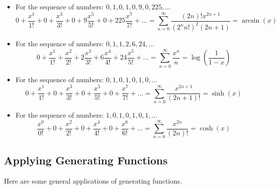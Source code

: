 \documentclass[letterpaper]{article}
\begin{document}
\begin{itemize}
    \item For the sequence of numbers: $0, 1, 0, 1, 0, 9, 0, 225, \dots$
    \[0 + \frac{x^1}{1!} + 0 + \frac{x^3}{3!} + 0 + 9 \frac{x^5}{5!} + 0 + 225 \frac{x^7}{7!} + \dots = \sum_{n = 0}^{\infty} \frac{(2n)! x^{2n + 1}}{(2^n n!)^2 (2n + 1)} = \arcsin(x)\]

    \item For the sequence of numbers: $0, 1, 1, 2, 6, 24, \dots$
    \[0 + \frac{x^1}{1!} + \frac{x^2}{2!} + 2 \frac{x^3}{3!} + 6 \frac{x^4}{4!} + 24 \frac{x^5}{5!} + \dots = \sum_{n = 0}^{\infty} \frac{x^n}{n} = \log\left(\frac{1}{1 - x}\right)\]

    \item For the sequence of numbers: $0, 1, 0, 1, 0, 1, 0, \dots$
    \[0 + \frac{x^1}{1!} + 0 + \frac{x^3}{3!} + 0 + \frac{x^5}{5!} + 0 + \frac{x^7}{7!} + \dots = \sum_{n = 0}^{\infty} \frac{x^{2n + 1}}{(2n + 1)!} = \sinh(x)\]

    \item For the sequence of numbers: $1, 0, 1, 0, 1, 0, 1, \dots$ 
    \[\frac{x^0}{0!} + 0 + \frac{x^2}{2!} + 0 + \frac{x^4}{4!} + 0 + \frac{x^6}{6!} + \dots = \sum_{n = 0}^{\infty} \frac{x^{2n}}{(2n)!} = \cosh(x)\]
\end{itemize}

\subsection{Applying Generating Functions}
Here are some general applications of generating functions. 
\end{document}
